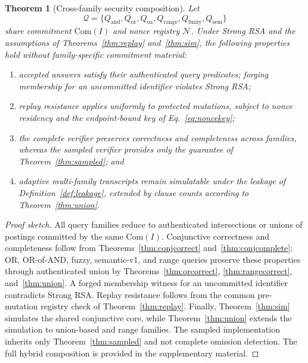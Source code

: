 \documentclass[journal]{IEEEtran}
\theoremstyle{tight}
\newtheorem{theorem}{Theorem}
\theoremstyle{remark}
\theoremstyle{plain}
\begin{document}
\begin{theorem}[Cross-family security composition]
\label{thm:composition}
Let
\[
\mathcal Q=
\{Q_{\mathrm{and}},Q_{\mathrm{or}},Q_{\mathrm{oa}},
Q_{\mathrm{range}},Q_{\mathrm{fuzzy}},Q_{\mathrm{sem}}\}
\]
share commitment \(\mathrm{Com}(I)\) and nonce registry \(\mathcal N\). Under Strong RSA and the assumptions of Theorems~\ref{thm:replay} and~\ref{thm:sim}, the following properties hold without family-specific commitment material:

\begin{enumerate}[label=\textnormal{(\roman*)},topsep=2pt,itemsep=1pt]
\item accepted answers satisfy their authenticated query predicates; forging membership for an uncommitted identifier violates Strong RSA;

\item replay resistance applies uniformly to protected mutations, subject to nonce residency and the endpoint-bound key of Eq.~\eqref{eq:noncekey};

\item the complete verifier preserves correctness and completeness across families, whereas the sampled verifier provides only the guarantee of Theorem~\ref{thm:sampled}; and

\item adaptive multi-family transcripts remain simulatable under the leakage of Definition~\ref{def:leakage}, extended by clause counts according to Theorem~\ref{thm:union}.
\end{enumerate}
\end{theorem}

\begin{proof}[Proof sketch]
All query families reduce to authenticated intersections or unions of postings committed by the same \(\mathrm{Com}(I)\). Conjunctive correctness and completeness follow from Theorems~\ref{thm:conjcorrect} and~\ref{thm:conjcomplete}; OR, OR-of-AND, fuzzy, semantic-v1, and range queries preserve these properties through authenticated union by Theorems~\ref{thm:orcorrect}, \ref{thm:rangecorrect}, and~\ref{thm:union}. A forged membership witness for an uncommitted identifier contradicts Strong RSA. Replay resistance follows from the common pre-mutation registry check of Theorem~\ref{thm:replay}. Finally, Theorem~\ref{thm:sim} simulates the shared conjunctive core, while Theorem~\ref{thm:union} extends the simulation to union-based and range families. The sampled implementation inherits only Theorem~\ref{thm:sampled} and not complete omission detection. The full hybrid composition is provided in the supplementary material.
\end{proof}
\end{document}

